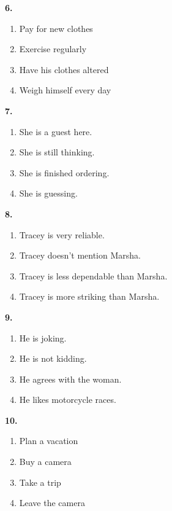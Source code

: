 \documentclass[12pt]{article}
\begin{document}
\par
\vspace{0.25\baselineskip}
\noindent\textbf{6.}
\begin{enumerate}[label=(\Alph*),leftmargin=*,itemsep=0.2em]
\item Pay for new clothes
\item Exercise regularly
\item Have his clothes altered
\item Weigh himself every day
\end{enumerate}
\par
\vspace{0.25\baselineskip}
\noindent\textbf{7.}
\begin{enumerate}[label=(\Alph*),leftmargin=*,itemsep=0.2em]
\item She is a guest here.
\item She is still thinking.
\item She is finished ordering.
\item She is guessing.
\end{enumerate}
\par
\vspace{0.25\baselineskip}
\noindent\textbf{8.}
\begin{enumerate}[label=(\Alph*),leftmargin=*,itemsep=0.2em]
\item Tracey is very reliable.
\item Tracey doesn't mention Marsha.
\item Tracey is less dependable than Marsha.
\item Tracey is more striking than Marsha.
\end{enumerate}
\par
\vspace{0.25\baselineskip}
\noindent\textbf{9.}
\begin{enumerate}[label=(\Alph*),leftmargin=*,itemsep=0.2em]
\item He is joking.
\item He is not kidding.
\item He agrees with the woman.
\item He likes motorcycle races.
\end{enumerate}
\par
\vspace{0.25\baselineskip}
\noindent\textbf{10.}
\begin{enumerate}[label=(\Alph*),leftmargin=*,itemsep=0.2em]
\item Plan a vacation
\item Buy a camera
\item Take a trip
\item Leave the camera
\end{enumerate}
\end{document}
